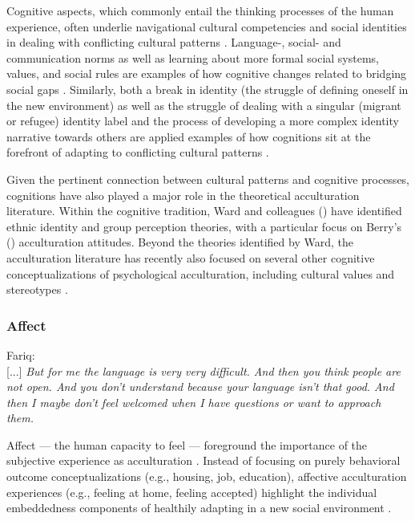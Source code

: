 \documentclass[man, 12pt, a4paper, mask]{apa7}
\begin{document}
Cognitive aspects, which commonly entail the thinking processes of the human experience, often underlie navigational cultural competencies and social identities in dealing with conflicting cultural patterns \citep[][]{Padilla2003}. Language-, social- and communication norms as well as learning about more formal social systems, values, and social rules are examples of how cognitive changes related to bridging social gaps \citep[e.g.,][]{Gelfand2011, Nisbett2002}. Similarly, both a break in identity (the struggle of defining oneself in the new environment) as well as the struggle of dealing with a singular (migrant or refugee) identity label and the process of developing a more complex identity narrative towards others are applied examples of how cognitions sit at the forefront of adapting to conflicting cultural patterns \citep[e.g.,][]{Verkuyten2012}.

Given the pertinent connection between cultural patterns and cognitive processes, cognitions have also played a major role in the theoretical acculturation literature. Within the cognitive tradition, Ward and colleagues (\citeyear{Ward2001, Ward2019}) have identified ethnic identity and group perception theories, with a particular focus on Berry's (\citeyear{Berry1997b}) acculturation attitudes. Beyond the theories identified by Ward, the acculturation literature has recently also focused on several other cognitive conceptualizations of psychological acculturation, including cultural values \citep[e.g.,][]{Marin2003} and stereotypes \citep[e.g.,][]{Stanciu2018}. 

\subsubsection{Affect}
\begin{displayquote}
    Fariq:\\
    {[...]} \textit{But for me the language is very very difficult. And then you think people are not open. And you don't understand because your language isn't that good. And then I maybe don't feel welcomed when I have questions or want to approach them.}
\end{displayquote}

Affect --- the human capacity to feel \citep[including emotions and moods;][]{FeldmanBarrett2007} --- foreground the importance of the subjective experience as acculturation \citep[][]{Holodynski2012}. Instead of focusing on purely behavioral outcome conceptualizations (e.g., housing, job, education), affective acculturation experiences (e.g., feeling at home, feeling accepted) highlight the individual embeddedness components of healthily adapting in a new social environment \citep[][]{mesquita2016}. 
\end{document}
